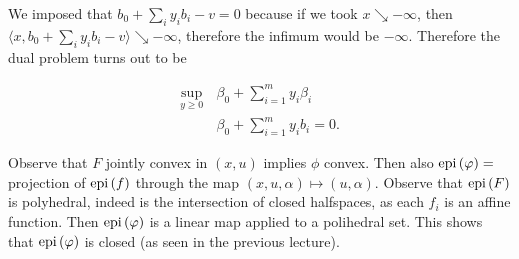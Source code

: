 \begin{example}
    We imposed that $b_0 + \sum_i y_i b_i -v = 0$ because if we took $x\searrow -\infty$, then $\langle x, b_0 + \sum_i y_i b_i  -v \rangle \searrow -\infty$, therefore the infimum would be $-\infty$. Therefore the dual problem turns out to be 

    \begin{align*}
        \sup_{y \ge 0} \, &\beta_0 + \sum_{i=1}^m y_i \beta_i \\
        &\beta_0 + \sum_{i=1}^m y_i b_i = 0.
    \end{align*}

\end{example}

\begin{remark}
    
    Observe that $F$ jointly convex in $(x,u)$ implies $\phi$ convex. Then also $\mathrm{epi}\left(\varphi\right) = $ projection of $\mathrm{epi}\left(f\right)$ through the map $(x,u,\alpha) \mapsto (u,\alpha)$. Observe that $\mathrm{epi}\left(F\right)$ is polyhedral, indeed is the intersection of closed halfspaces, as each $f_i$ is an affine function. Then $\mathrm{epi}\left(\varphi\right)$ is a linear map applied to a polihedral set. This shows that $\mathrm{epi}\left(\varphi\right)$ is closed (as seen in the previous lecture).

\end{remark}





